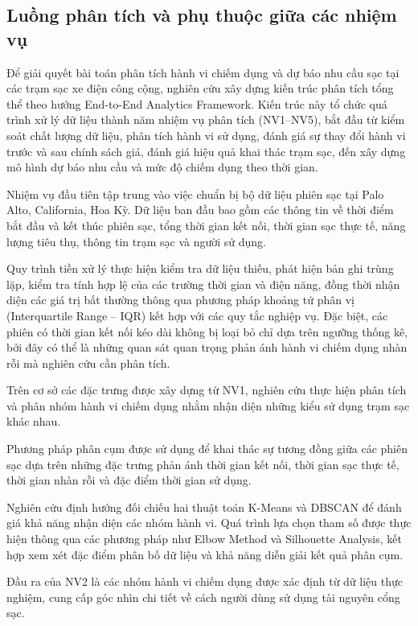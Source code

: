 \documentclass[conference,a4paper]{IEEEtran}
\begin{document}
\subsection{Luồng phân tích và phụ thuộc giữa các nhiệm vụ}

Để giải quyết bài toán phân tích hành vi chiếm dụng và dự báo nhu cầu sạc tại các trạm sạc xe điện công cộng, nghiên cứu xây dựng kiến trúc phân tích tổng thể theo hướng End-to-End Analytics Framework. Kiến trúc này tổ chức quá trình xử lý dữ liệu thành năm nhiệm vụ phân tích (NV1–NV5), bắt đầu từ kiểm soát chất lượng dữ liệu, phân tích hành vi sử dụng, đánh giá sự thay đổi hành vi trước và sau chính sách giá, đánh giá hiệu quả khai thác trạm sạc, đến xây dựng mô hình dự báo nhu cầu và mức độ chiếm dụng theo thời gian.

Nhiệm vụ đầu tiên tập trung vào việc chuẩn bị bộ dữ liệu phiên sạc tại Palo Alto, California, Hoa Kỳ. Dữ liệu ban đầu bao gồm các thông tin về thời điểm bắt đầu và kết thúc phiên sạc, tổng thời gian kết nối, thời gian sạc thực tế, năng lượng tiêu thụ, thông tin trạm sạc và người sử dụng.

Quy trình tiền xử lý thực hiện kiểm tra dữ liệu thiếu, phát hiện bản ghi trùng lặp, kiểm tra tính hợp lệ của các trường thời gian và điện năng, đồng thời nhận diện các giá trị bất thường thông qua phương pháp khoảng tứ phân vị (Interquartile Range – IQR) kết hợp với các quy tắc nghiệp vụ. Đặc biệt, các phiên có thời gian kết nối kéo dài không bị loại bỏ chỉ dựa trên ngưỡng thống kê, bởi đây có thể là những quan sát quan trọng phản ánh hành vi chiếm dụng nhàn rỗi mà nghiên cứu cần phân tích.

Trên cơ sở các đặc trưng được xây dựng từ NV1, nghiên cứu thực hiện phân tích và phân nhóm hành vi chiếm dụng nhằm nhận diện những kiểu sử dụng trạm sạc khác nhau.

Phương pháp phân cụm được sử dụng để khai thác sự tương đồng giữa các phiên sạc dựa trên những đặc trưng phản ánh thời gian kết nối, thời gian sạc thực tế, thời gian nhàn rỗi và đặc điểm thời gian sử dụng.

Nghiên cứu định hướng đối chiếu hai thuật toán K-Means và DBSCAN để đánh giá khả năng nhận diện các nhóm hành vi. Quá trình lựa chọn tham số được thực hiện thông qua các phương pháp như Elbow Method và Silhouette Analysis, kết hợp xem xét đặc điểm phân bố dữ liệu và khả năng diễn giải kết quả phân cụm.

Đầu ra của NV2 là các nhóm hành vi chiếm dụng được xác định từ dữ liệu thực nghiệm, cung cấp góc nhìn chi tiết về cách người dùng sử dụng tài nguyên cổng sạc.
\end{document}
